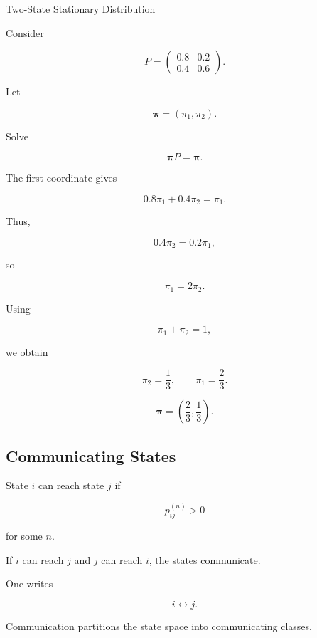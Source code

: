 \begin{workedexamplebox}{Two-State Stationary Distribution}

Consider

\[
P
=
\begin{pmatrix}
0.8&0.2\\
0.4&0.6
\end{pmatrix}.
\]

Let

\[
\boldsymbol{\pi}
=
(\pi_1,\pi_2).
\]

Solve

\[
\boldsymbol{\pi}P
=
\boldsymbol{\pi}.
\]

The first coordinate gives

\[
0.8\pi_1+0.4\pi_2
=
\pi_1.
\]

Thus,

\[
0.4\pi_2
=
0.2\pi_1,
\]

so

\[
\pi_1=2\pi_2.
\]

Using

\[
\pi_1+\pi_2=1,
\]

we obtain

\[
\pi_2=\frac13,
\qquad
\pi_1=\frac23.
\]

\begin{answerbox}
\[
\boxed{
\boldsymbol{\pi}
=
\left(
\frac23,
\frac13
\right).
}
\]
\end{answerbox}

\end{workedexamplebox}

\subsection{Communicating States}
\label{subsec:communicating-states}

State \(i\) can reach state \(j\) if

\[
p_{ij}^{(n)}>0
\]

for some \(n\).

If \(i\) can reach \(j\) and \(j\) can reach \(i\), the states
communicate.

One writes

\[
\boxed{
i\leftrightarrow j.
}
\]

Communication partitions the state space into communicating classes.

